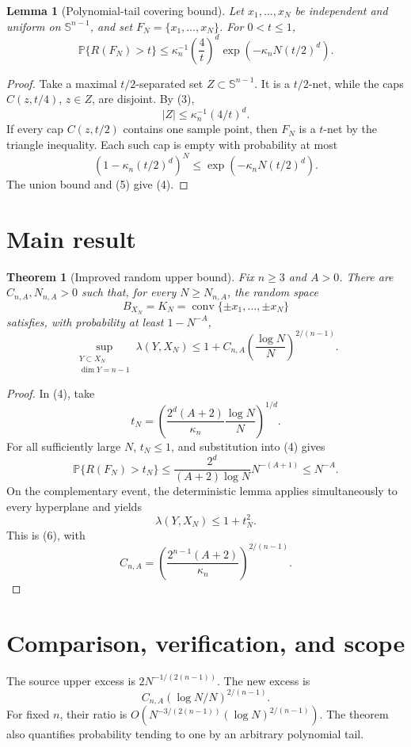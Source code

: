 \documentclass[11pt]{article}
\newtheorem{theorem}{Theorem}
\newtheorem{lemma}{Lemma}
\newcommand{\Sph}{\mathbb S^{n-1}}
\newcommand{\conv}{\operatorname{conv}}
\begin{document}
\begin{lemma}[Polynomial-tail covering bound]
Let \(x_1,\ldots,x_N\) be independent and uniform on \(\Sph\), and set
\(F_N=\{x_1,\ldots,x_N\}\).  For \(0<t\leq1\),
\[
 \mathbb P\{R(F_N)>t\}
 \leq \kappa_n^{-1}\left(\frac4t\right)^d
       \exp\left(-\kappa_n N(t/2)^d\right).             \tag{4}
\]
\end{lemma}

\begin{proof}
Take a maximal \(t/2\)-separated set \(Z\subset\Sph\).  It is a
\(t/2\)-net, while the caps \(C(z,t/4)\), \(z\in Z\), are disjoint.
By (3),
\[
 |Z|\leq\kappa_n^{-1}(4/t)^d.                          \tag{5}
\]
If every cap \(C(z,t/2)\) contains one sample point, then \(F_N\) is a
\(t\)-net by the triangle inequality.  Each such cap is empty with
probability at most
\[
 (1-\kappa_n(t/2)^d)^N
 \leq\exp(-\kappa_n N(t/2)^d).
\]
The union bound and (5) give (4).
\end{proof}

\section*{Main result}
\begin{theorem}[Improved random upper bound]
Fix \(n\geq3\) and \(A>0\).  There are \(C_{n,A},N_{n,A}>0\) such that, for
every \(N\geq N_{n,A}\), the random space
\[
 B_{X_N}=K_N=\conv\{\pm x_1,\ldots,\pm x_N\}
\]
satisfies, with probability at least \(1-N^{-A}\),
\[
 \sup_{\substack{Y\subset X_N\\ \dim Y=n-1}}
 \lambda(Y,X_N)
 \leq1+C_{n,A}\left(\frac{\log N}{N}\right)^{2/(n-1)}. \tag{6}
\]
\end{theorem}

\begin{proof}
In (4), take
\[
 t_N=
 \left(\frac{2^d(A+2)}{\kappa_n}\frac{\log N}{N}\right)^{1/d}.
\]
For all sufficiently large \(N\), \(t_N\leq1\), and substitution into (4)
gives
\[
 \mathbb P\{R(F_N)>t_N\}
 \leq\frac{2^d}{(A+2)\log N}N^{-(A+1)}
 \leq N^{-A}.
\]
On the complementary event, the deterministic lemma applies simultaneously
to every hyperplane and yields
\[
 \lambda(Y,X_N)\leq1+t_N^2.
\]
This is (6), with
\[
 C_{n,A}=
 \left(\frac{2^{n-1}(A+2)}{\kappa_n}\right)^{2/(n-1)}.
\]
\end{proof}

\section*{Comparison, verification, and scope}
The source upper excess is \(2N^{-1/(2(n-1))}\).  The new excess is
\[
 C_{n,A}(\log N/N)^{2/(n-1)}.
\]
For fixed \(n\), their ratio is
\(O(N^{-3/(2(n-1))}(\log N)^{2/(n-1)})\).  The theorem also quantifies
probability tending to one by an arbitrary polynomial tail.
\end{document}
